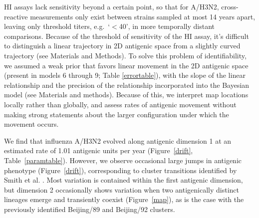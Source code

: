 \documentclass[11pt,oneside,letterpaper]{article}
\begin{document}
HI assays lack sensitivity beyond a certain point, so that for A/H3N2, cross-reactive measurements only exist between strains sampled at most 14 years apart, leaving only threshold titers, e.g.\ `$<$40', in more temporally distant comparisons.  
Because of the threshold of sensitivity of the HI assay, it's difficult to distinguish a linear trajectory in 2D antigenic space from a slightly curved trajectory (see Materials and Methods).
To solve this problem of identifiability, we assumed a weak prior that favors linear movement in the 2D antigenic space (present in models 6 through 9; Table \ref{errortable}), with the slope of the linear relationship and the precision of the relationship incorporated into the Bayesian model (see Materials and methods).
Because of this, we interpret map locations locally rather than globally, and assess rates of antigenic movement without making strong statements about the larger configuration under which the movement occurs.
 
We find that influenza A/H3N2 evolved along antigenic dimension 1 at an estimated rate of 1.01 antigenic units per year (Figure~\ref{drift}, Table~\ref{paramtable}).
However, we observe occasional large jumps in antigenic phenotype (Figure~\ref{drift}), corresponding to cluster transitions identified by Smith et al. \cite{Smith04}.  
Most variation is contained within the first antigenic dimension, but dimension 2 occasionally shows variation when two antigenically distinct lineages emerge and transiently coexist (Figure~\ref{map}), as is the case with the previously identified Beijing/89 and Beijing/92 clusters.
\end{document}
